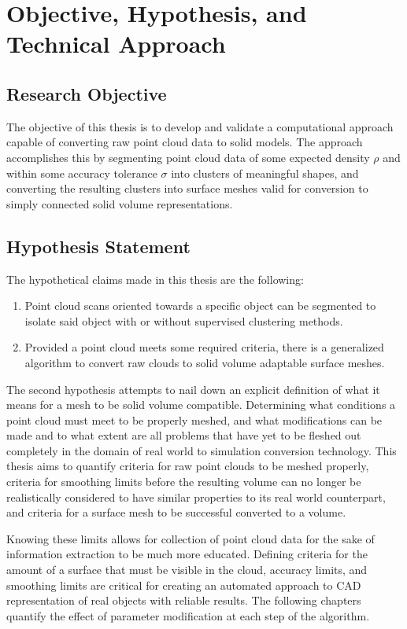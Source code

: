 \documentclass[12pt]{drexelthesis}
\let\Oldsection\section
\renewcommand{\section}{\FloatBarrier\Oldsection}
\begin{document}
\chapter{Objective, Hypothesis, and Technical Approach}
\label{chap:purposestatement}

\section{Research Objective}
The objective of this thesis is to develop and validate a computational approach capable of converting raw point cloud data to solid models. The approach accomplishes this by segmenting point cloud data of some expected density $\rho$ and within some accuracy tolerance $\sigma$ into clusters of meaningful shapes, and converting the resulting clusters into surface meshes valid for conversion to simply connected solid volume representations.

\section{Hypothesis Statement}
The hypothetical claims made in this thesis are the following:

\begin{enumerate}
	\item Point cloud scans oriented towards a specific object can be segmented to isolate said object with or without supervised clustering methods.
	\item Provided a point cloud meets some required criteria, there is a generalized algorithm to convert raw clouds to solid volume adaptable surface meshes.
\end{enumerate}

The second hypothesis attempts to nail down an explicit definition of what it means for a mesh to be solid volume compatible. Determining what conditions a point cloud must meet to be properly meshed, and what modifications can be made and to what extent are all problems that have yet to be fleshed out completely in the domain of real world to simulation conversion technology. This thesis aims to quantify criteria for raw point clouds to be meshed properly, criteria for smoothing limits before the resulting volume can no longer be realistically considered to have similar properties to its real world counterpart, and criteria for a surface mesh to be successful converted to a volume. 

Knowing these limits allows for collection of point cloud data for the sake of information extraction to be much more educated. Defining criteria for the amount of a surface that must be visible in the cloud, accuracy limits, and smoothing limits are critical for creating an automated approach to CAD representation of real objects with reliable results. The following chapters quantify the effect of parameter modification at each step of the algorithm.
\end{document}
